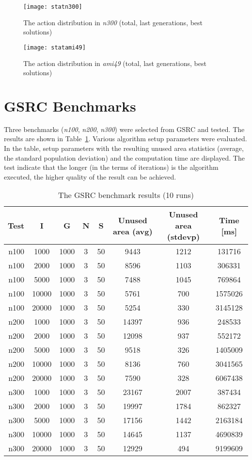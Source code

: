 \begin{figure}[p]
\centering
\texttt{[image: statn300]}
\caption{The action distribution in {\em n300} (total, last generations, best solutions)}
\label{fig:statn300}
\end{figure}

\begin{figure}[p]
\centering
\texttt{[image: statami49]}
\caption{The action distribution in {\em ami49} (total, last generations, best solutions)}
\label{fig:statami49}
\end{figure}

\section{GSRC Benchmarks}

Three benchmarks ({\em n100}, {\em n200}, {\em n300}) were selected from GSRC \cite{benchgsrc} and tested. The results are shown in Table~\ref{tab:gsrc}. Various algorithm setup parameters were evaluated. In the table, setup parameters with the resulting unused area statistics (average, the standard population deviation) and the computation time are displayed. The test indicate that the longer (in the terms of iterations) is the algorithm executed, the higher quality of the result can be achieved.

\begin{table}
\centering
\begin{tabular}{|r|c|c|c|c|c|c|c|}
\hline
Test & I & G & N & S & Unused area (avg) & Unused area (stdevp) & Time [ms] \\
\hline
\hline
n100 & 1000 & 1000 & 3 & 50 & 9443 & 1212 & 131716 \\
n100 & 2000 & 1000 & 3 & 50 & 8596 & 1103 & 306331 \\
n100 & 5000 & 1000 & 3 & 50 & 7488 & 1045 & 769864 \\
n100 & 10000 & 1000 & 3 & 50 & 5761 & 700 & 1575026 \\
n100 & 20000 & 1000 & 3 & 50 & 5254 & 330 & 3145128 \\
\hline
n200 & 1000 & 1000 & 3 & 50 & 14397 & 936 & 248533 \\
n200 & 2000 & 1000 & 3 & 50 & 12098 & 937 & 552172 \\
n200 & 5000 & 1000 & 3 & 50 & 9518 & 326 & 1405009 \\
n200 & 10000 & 1000 & 3 & 50 & 8136 & 760 & 3041565 \\
n200 & 20000 & 1000 & 3 & 50 & 7590 & 328 & 6067438 \\
\hline
n300 & 1000 & 1000 & 3 & 50 & 23167 & 2007 & 387434 \\
n300 & 2000 & 1000 & 3 & 50 & 19997 & 1784 & 862327 \\
n300 & 5000 & 1000 & 3 & 50 & 17156 & 1442 & 2163184 \\
n300 & 10000 & 1000 & 3 & 50 & 14645 & 1137 & 4690839 \\
n300 & 20000 & 1000 & 3 & 50 & 12929 & 494 & 9199609 \\
\hline
\end{tabular}
\caption{The GSRC benchmark results (10 runs)}
\label{tab:gsrc}
\end{table}

